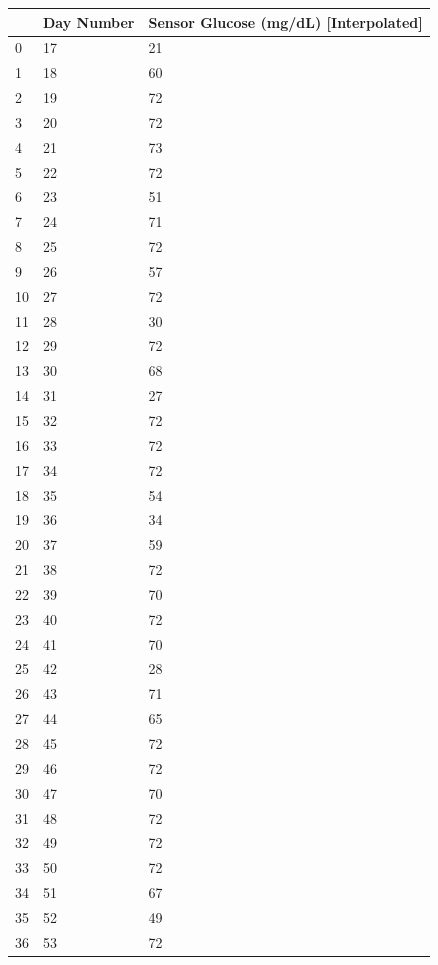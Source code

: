 \bigskip\noindent
\begin{tabular}{p{}p{}p{}}
\toprule
 & Day Number & Sensor Glucose (mg/dL) [Interpolated] \\
\hline
0 & 17 & 21 \\
\hline
1 & 18 & 60 \\
\hline
2 & 19 & 72 \\
\hline
3 & 20 & 72 \\
\hline
4 & 21 & 73 \\
\hline
5 & 22 & 72 \\
\hline
6 & 23 & 51 \\
\hline
7 & 24 & 71 \\
\hline
8 & 25 & 72 \\
\hline
9 & 26 & 57 \\
\hline
10 & 27 & 72 \\
\hline
11 & 28 & 30 \\
\hline
12 & 29 & 72 \\
\hline
13 & 30 & 68 \\
\hline
14 & 31 & 27 \\
\hline
15 & 32 & 72 \\
\hline
16 & 33 & 72 \\
\hline
17 & 34 & 72 \\
\hline
18 & 35 & 54 \\
\hline
19 & 36 & 34 \\
\hline
20 & 37 & 59 \\
\hline
21 & 38 & 72 \\
\hline
22 & 39 & 70 \\
\hline
23 & 40 & 72 \\
\hline
24 & 41 & 70 \\
\hline
25 & 42 & 28 \\
\hline
26 & 43 & 71 \\
\hline
27 & 44 & 65 \\
\hline
28 & 45 & 72 \\
\hline
29 & 46 & 72 \\
\hline
30 & 47 & 70 \\
\hline
31 & 48 & 72 \\
\hline
32 & 49 & 72 \\
\hline
33 & 50 & 72 \\
\hline
34 & 51 & 67 \\
\hline
35 & 52 & 49 \\
\hline
36 & 53 & 72 \\

\end{tabular}
